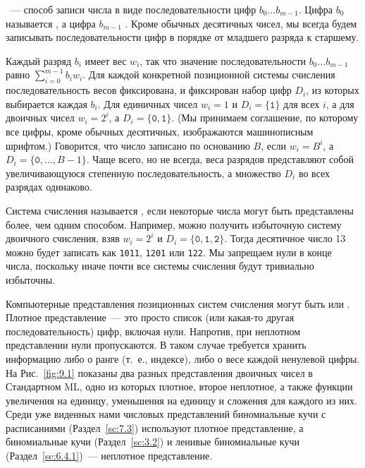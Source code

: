\cite{Knuth1973b}~--- способ записи числа в виде последовательности
цифр $b_0\ldots b_{m-1}$. Цифра $b_0$ называется , а цифра $b_{m-1}$ . Кроме обычных десятичных чисел, мы всегда будем
записывать последовательности цифр в порядке от младшего разряда к старшему.

Каждый разряд $b_i$ имеет вес $w_i$, так что значение
последовательности $b_0\ldots b_{m-1}$ равно $\sum_{i=0}^{m-1}
b_iw_i$. Для каждой конкретной позиционной системы счисления
последовательность весов фиксирована, и фиксирован набор цифр $D_i$,
из которых выбирается каждая $b_i$. Для единичных чисел $w_i = 1$ и
$D_i = \{\mathtt{1}\}$ для всех $i$, а для двоичных чисел $w_i = 2^i$,
а $D_i = \{\mathtt{0}, \mathtt{1}\}$. (Мы принимаем соглашение, по
которому все цифры, кроме обычных десятичных, изображаются
машинописным шрифтом.) 
Говорится, что число записано по основанию $B$, если $w_i =
B^i$, а $D_i = \{\mathtt{0}, \ldots, B-1\}$. Чаще всего, но не всегда,
веса разрядов представляют собой увеличивающуюся степенную
последовательность, а множество $D_i$ во всех разрядах одинаково.

Система счисления называется , если
некоторые числа могут быть представлены более, чем одним способом.
Например, можно получить избыточную систему двоичного счисления, взяв
$w_i = 2^i$ и $D_i = \{\mathtt{0}, \mathtt{1}, \mathtt{2}\}$. Тогда
десятичное число 13 можно будет записать как \texttt{1011},
\texttt{1201} или \texttt{122}. Мы запрещаем нули в конце числа,
поскольку иначе почти все системы счисления будут тривиально
избыточны.

Компьютерные представления позиционных систем счисления могут быть
 или . Плотное
представление~--- это просто список (или какая-то другая
последовательность) цифр, включая нули. Напротив, при неплотном
представлении нули пропускаются. В таком случае требуется хранить
информацию либо о ранге (т.~е., индексе), либо о весе каждой ненулевой
цифры.  На Рис.~\ref{fig:9.1} показаны два разных представления
двоичных чисел в Стандартном ML, одно из которых плотное, второе
неплотное, а также функции увеличения на единицу, уменьшения на
единицу и сложения для каждого из них. Среди уже виденных нами
числовых представлений биномиальные кучи с расписаниями
(Раздел~\ref{sc:7.3}) используют плотное представление, а биномиальные
кучи (Раздел~\ref{sc:3.2}) и ленивые биномиальные кучи
(Раздел~\ref{sc:6.4.1})~--- неплотное представление.

